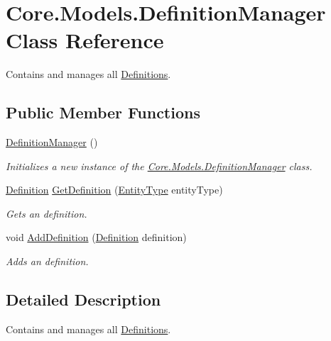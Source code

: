 \hypertarget{classCore_1_1Models_1_1DefinitionManager}{}\section{Core.\+Models.\+Definition\+Manager Class Reference}
\label{classCore_1_1Models_1_1DefinitionManager}


Contains and manages all \hyperlink{namespaceCore_1_1Models_1_1Definitions}{Definitions}.  


\subsection*{Public Member Functions}
\begin{DoxyCompactItemize}
\item 
\hyperlink{classCore_1_1Models_1_1DefinitionManager_a3c2c1909d8d1a7114c9937e1f60c596c}{Definition\+Manager} ()
\begin{DoxyCompactList}\small\item\em Initializes a new instance of the \hyperlink{classCore_1_1Models_1_1DefinitionManager}{Core.\+Models.\+Definition\+Manager} class. \end{DoxyCompactList}\item 
\hyperlink{classCore_1_1Models_1_1Definitions_1_1Definition}{Definition} \hyperlink{classCore_1_1Models_1_1DefinitionManager_a08d79c044487af124f2a449e200e84c2}{Get\+Definition} (\hyperlink{namespaceCore_1_1Models_1_1Definitions_a609ed13db028308ebc6c5fbd98615fdc}{Entity\+Type} entity\+Type)
\begin{DoxyCompactList}\small\item\em Gets an definition. \end{DoxyCompactList}\item 
void \hyperlink{classCore_1_1Models_1_1DefinitionManager_a11c894ac62397f0ecd223475f81ac770}{Add\+Definition} (\hyperlink{classCore_1_1Models_1_1Definitions_1_1Definition}{Definition} definition)
\begin{DoxyCompactList}\small\item\em Adds an definition. \end{DoxyCompactList}\end{DoxyCompactItemize}


\subsection{Detailed Description}
Contains and manages all \hyperlink{namespaceCore_1_1Models_1_1Definitions}{Definitions}. 



